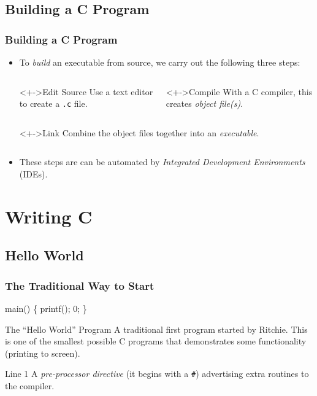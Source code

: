 \documentclass[smaller,table]{beamer} %
\begin{document}
\subsection{Building a C Program}
\begin{frame}
\frametitle{Building a C Program}
\begin{itemize}
\item To \emph{build} an executable from source, we carry out the following
three steps:
\begin{columns}
\begin{column}{3.1cm}
\begin{block}<+->{Edit Source}
Use a text editor to create a {\tt .c} file.
\end{block}
\end{column}
\begin{column}{3.8cm}
\begin{block}<+->{Compile}
With a C compiler, this creates \emph{object file(s)}.
\end{block}
\end{column}
\end{columns}
\begin{columns}
\begin{column}{3.8cm}
\begin{block}<+->{Link}
Combine the object files together into an \emph{executable}.
\end{block}
\end{column}
\end{columns}
\vspace{0.2in}
\item<+-> These steps are can be automated by \emph{Integrated Development Environments}
(IDEs).
\end{itemize}
\end{frame}

\section{Writing C}
\subsection{Hello World}
\ifhandout
\begin{frame}[fragile]
\frametitle{The Traditional Way to Start}
\begin{semiverbatim}
\kr\kl{} 
\kl
\kl{} main()
\kl\{
\kl   printf();
\kl   {} 0;
\kl\}
\end{semiverbatim}

\begin{block}{The ``Hello World'' Program}
A traditional first program started by Ritchie. This is one of the smallest possible C programs that demonstrates some functionality (printing to screen).
\end{block}

\begin{block}{Line 1}
A \emph{pre-processor directive} (it begins with a {\tt \#}) advertising extra routines to the compiler.
\end{block}
\end{frame}
\end{document}
